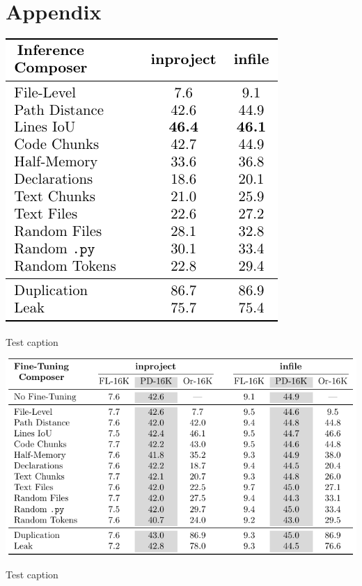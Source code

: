 \chapter{Appendix}

\begin{table}[htbp]
    \centering
    \includegraphics{tables/rq_a1.pdf}
    \caption{Test caption}\label{tab:dseek-inference}
\end{table}

\begin{table}[htbp]
    \centering
    \includegraphics[width=\textwidth]{tables/rq_a2.pdf}
    \caption{Test caption}\label{tab:dseek-fine-tuning}
\end{table}

